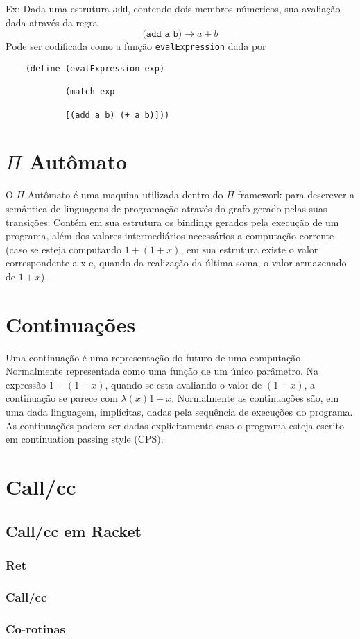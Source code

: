Ex:
    Dada uma estrutura \texttt{add}, contendo dois membros númericos, sua avaliação dada através da regra
    $$(\texttt{add a b)} \xrightarrow{} a+b  $$
    Pode ser codificada como a função \texttt{evalExpression} dada por
    
    \begin{verbatim}
    (define (evalExpression exp)
    
            (match exp
            
            [(add a b) (+ a b)]))
    \end{verbatim}
    
\section{$\Pi$ Autômato}
O $\Pi$ Autômato é uma maquina utilizada dentro do $\Pi$ framework para descrever a semântica de linguagens de programação através do grafo gerado pelas suas transições. Contém em sua estrutura os bindings gerados pela execução de um programa, além dos valores intermediários necessários a computação corrente (caso se esteja computando $1+(1+x)$, em sua estrutura existe o valor correspondente a x e, quando da realização da última soma, o valor armazenado de $1+x$).
\section{Continuações}
Uma continuação é uma representação do futuro de uma computação. Normalmente representada como uma função de um único parâmetro. Na expressão $1+(1+x)$, quando se esta avaliando o valor de $(1+x)$, a continuação se parece com $\lambda(x) 1+x$. Normalmente as continuações são, em uma dada linguagem, implícitas, dadas pela sequência de execuções do programa. As continuações podem ser dadas explicitamente caso o programa esteja escrito em continuation passing style (CPS). 
\section{Call/cc}
\subsection{Call/cc em Racket}
\subsubsection{Ret}
\subsubsection{Call/cc}
\subsubsection{Co-rotinas}